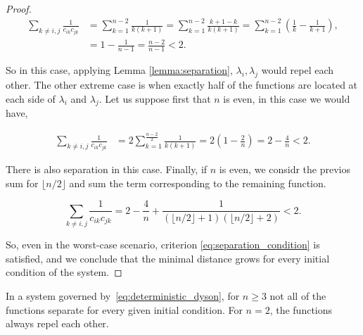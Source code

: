\begin{proof}
    \begin{align*}
        \sum_{k\neq i,j} \frac{1}{c_{ik}c_{jk}} &= \sum_{k=1}^{n-2} \frac{1}{k(k+1)} = \sum_{k=1}^{n-2} \frac{k+1 - k}{k(k+1)} = \sum_{k=1}^{n-2} \left( \frac{1}{k} - \frac{1}{k+1} \right),\\
        &= 1 - \frac{1}{n-1} = \frac{n-2}{n-1} < 2.
    \end{align*}

    So in this case, applying Lemma \ref{lemma:separation}, $\lambda_i,\lambda_j$ would repel each other. The other extreme case is when exactly half of the functions are located at each side of $\lambda_i$ and $\lambda_j$. Let us suppose first that $n$ is even, in this case we would have,

    \begin{align*}
        \sum_{k\neq i,j} \frac{1}{c_{ik}c_{jk}} &= 2 \sum_{k=1}^{\frac{n-2}{2}} \frac{1}{k(k+1)} = 2\left(1 - \frac{2}{n}\right) = 2 - \frac4n < 2.
    \end{align*}

    There is also separation in this case. Finally, if $n$ is even, we considr the previos sum for $\lfloor n/2 \rfloor$ and sum the term corresponding to the remaining function.

    \begin{equation*}
        \sum_{k\neq i,j} \frac{1}{c_{ik}c_{jk}} = 2 - \frac{4}{n} + \frac1{(\lfloor n/2\rfloor+1)(\lfloor n/2\rfloor +2)} < 2.
    \end{equation*}

    So, even in the worst-case scenario, criterion \eqref{eq:separation_condition} is satisfied, and we conclude that the minimal distance grows for every initial condition of the system.
\end{proof}

\begin{corollary}
    In a system governed by~\eqref{eq:deterministic_dyson}, for $n\ge3$ not all of the functions separate for every given initial condition. For $n =2$, the functions always repel each other.
\end{corollary}

